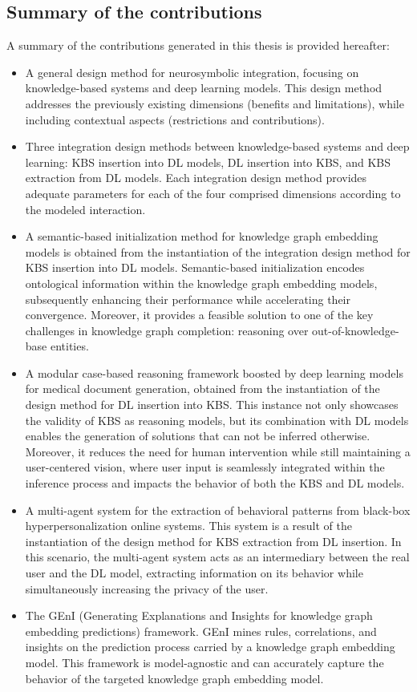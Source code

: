 \subsection{Summary of the contributions}
A summary of the contributions generated in this thesis is provided hereafter:
\begin{itemize}
    \item A general design method for neurosymbolic integration, focusing on knowledge-based systems and deep learning models. This design method addresses the previously existing dimensions (benefits and limitations), while including contextual aspects (restrictions and contributions).
    \item Three integration design methods between knowledge-based systems and deep learning: KBS insertion into DL models, DL insertion into KBS, and KBS extraction from DL models. Each integration design method provides adequate parameters for each of the four comprised dimensions according to the modeled interaction.
    \item A semantic-based initialization method for knowledge graph embedding models is obtained from the instantiation of the integration design method for KBS insertion into DL models. Semantic-based initialization encodes ontological information within the knowledge graph embedding models, subsequently enhancing their performance while accelerating their convergence. Moreover, it provides a feasible solution to one of the key challenges in knowledge graph completion: reasoning over out-of-knowledge-base entities.
    \item A modular case-based reasoning framework boosted by deep learning models for medical document generation, obtained from the instantiation of the design method for DL insertion into KBS. This instance not only showcases the validity of KBS as reasoning models, but its combination with DL models enables the generation of solutions that can not be inferred otherwise. Moreover, it reduces the need for human intervention while still maintaining a user-centered vision, where user input is seamlessly integrated within the inference process and impacts the behavior of both the KBS and DL models. 
    \item A multi-agent system for the extraction of behavioral patterns from black-box hyperpersonalization online systems. This system is a result of the instantiation of the design method for KBS extraction from DL insertion. In this scenario, the multi-agent system acts as an intermediary between the real user and the DL model, extracting information on its behavior while simultaneously increasing the privacy of the user.
    \item The GEnI (Generating Explanations and Insights for knowledge graph embedding predictions) framework. GEnI mines rules, correlations, and insights on the prediction process carried by a knowledge graph embedding model. This framework is model-agnostic and can accurately capture the behavior of the targeted knowledge graph embedding model. 
\end{itemize}



